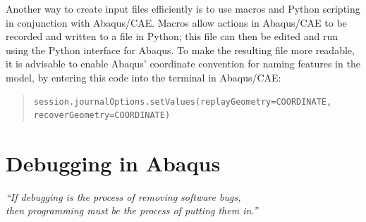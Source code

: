 \documentclass[10pt,letterpaper,oneside]{report}
\begin{document}
Another way to create input files efficiently is to use macros and Python scripting in conjunction with Abaqus/CAE.  Macros allow actions in Abaqus/CAE to be recorded and written to a file in Python; this file can then be edited and run using the Python interface for Abaqus.  To make the resulting file more readable, it is advisable to enable Abaqus' coordinate convention for naming features in the model, by entering this code into the terminal in Abaqus/CAE:
\begin{quote} \begin{lstlisting}
session.journalOptions.setValues(replayGeometry=COORDINATE, recoverGeometry=COORDINATE)
\end{lstlisting} \end{quote}

\section{Debugging in Abaqus}

\begin{center}
\emph{“If debugging is the process of removing software bugs, \\ then programming must be the process of putting them in.”} 
\end{center}
\end{document}
